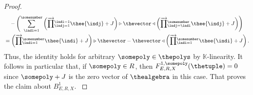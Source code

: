 \documentclass[10pt,a4paper]{amsart}
\numberwithin{equation}{section}
\newcommand{\HSuacoboundaries}[4]{B^{#1}_{#2,#3,#4}}
\newcommand{\HSuafuncxx}[6]{F^{#1,#5}_{#2,#3,#4}(#6)}
\newcommand{\Sleftmoduleaction}{\triangleright}
\newcommand{\Srightmoduleaction}{\triangleleft}
\newcommand{\tsrightwardproduct}[2]{{\overrightarrow{ \prod}}\vphantom{ \prod}_{#1}^{#2}}
\newcommand{\thegens}{E}
\newcommand{\therels}{R}
\newcommand{\theideal}{J}
\newcommand{\thefield}{\mathbb{K}}
\newcommand{\themodule}{X}
\begin{document}
{{\begin{proof}
{\begin{align*}
      &{}\quad-\left(\sum_{\indi=1}^{\somenumber}\left(\tsrightwardproduct{\indj=1}{\indi-1}{\thee{\indj}+\theideal}\right)\Sleftmoduleaction\thevector\Srightmoduleaction\left(\tsrightwardproduct{\indj=\indi}{\somenumber}{\thee{\indj}+\theideal}\right)\right)\\
      &{}=\left(\tsrightwardproduct{\indi=1}{\somenumber}{\thee{\indi}+\theideal}\right)\Sleftmoduleaction\thevector-\thevector\Srightmoduleaction\left(\tsrightwardproduct{\indi=1}{\somenumber}{\thee{\indi}+\theideal}\right).
    \end{align*}
    Thus, the identity holds for arbitrary $\somepoly\in\thepolys$ by $\thefield$-linearity. It follows in particular that, if $\somepoly\in\therels$, then  $\HSuafuncxx{1}{\thegens}{\therels}{\themodule}{\somepoly}{\thetuple}=0$ since $\somepoly+\theideal$ is the zero vector of $\thealgebra$ in this case.
    That proves the claim about $\HSuacoboundaries{1}{\thegens}{\therels}{\themodule}$.
    }
  \end{proof}
}

}
\end{document}

